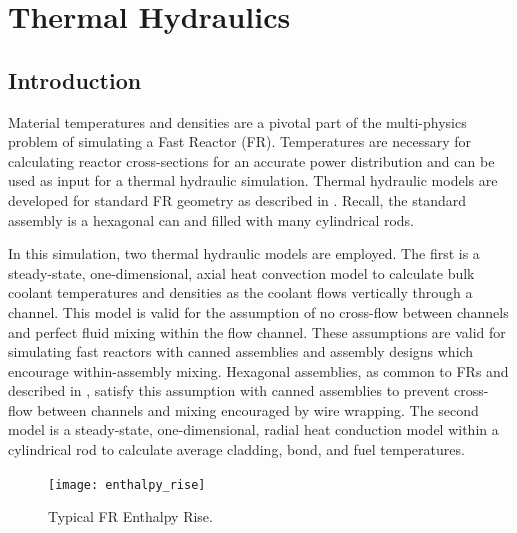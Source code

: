 \chapter{Thermal Hydraulics}
\label{ch:thermalHydraulics}

\section{Introduction}
  Material temperatures and densities are a pivotal part of the multi-physics 
  problem of simulating a Fast Reactor (FR). Temperatures are necessary for
  calculating reactor cross-sections for an accurate power distribution and can
  be used as input for a thermal hydraulic simulation. Thermal hydraulic models
  are developed for standard FR geometry as described in
  . Recall, the standard assembly is a hexagonal 
  can and filled with many cylindrical rods. 

  In this simulation, two thermal hydraulic models are employed. The first is a 
  steady-state, one-dimensional, axial heat convection model to calculate bulk
  coolant temperatures and densities as the coolant flows vertically through a 
  channel.  This model is valid for the assumption of no cross-flow between 
  channels and perfect fluid mixing within the flow channel. These assumptions 
  are valid for simulating fast reactors with canned assemblies and assembly 
  designs which encourage within-assembly mixing. Hexagonal assemblies, as 
  common to FRs and described in , satisfy this 
  assumption with canned assemblies to prevent cross-flow between channels and 
  mixing encouraged by wire wrapping. The second model is a steady-state, 
  one-dimensional, radial heat conduction model within a cylindrical rod to 
  calculate average cladding, bond, and fuel temperatures.

  \begin{figure}
    \centering
    \texttt{[image: enthalpy\_rise]}
    \caption{Typical FR Enthalpy Rise.}
    \label{fig:enthalpy_rise}
  \end{figure}


